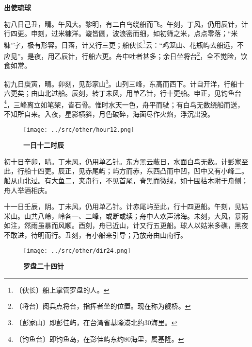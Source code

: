 \documentclass[12pt,UTF-8,openany]{ctexbook}
\begin{document}
\begin{normalsize}
    
    
    \begin{center}
        \textbf{出使琉球}
    \end{center}
    
    初八日己丑，晴。午风大。黎明，有二白鸟绕船而飞。午刻，丁风，仍用辰针，计行四更。申刻，过米糠洋。漩皆圆，波浪密而细，如初筛之米，点点零落；“米糠”字，极有形容。日落，计又行三更；船伙长\footnote{〔伙长〕船上掌管罗盘的人。}云：“鸡笼山、花瓶屿去船远，不应见”。是夜，用乙辰针，行船六更。舟中吐者甚多；余日坐将台\footnote{〔将台〕阅兵点将台，指挥者坐的位置。现在称为舰桥。}，全不觉险，饮食如常。
    
    初九日庚寅，晴。卯刻，见彭家山\footnote{〔彭家山〕即彭佳屿，在台湾省基隆港北约30海里。}。山列三峰，东高而西下。计自开洋，行船十六更矣；由山北过船。辰刻，转丁未风，用单乙针，行十更船。申正，见钓鱼台\footnote{〔钓鱼台〕即钓鱼岛，在彭佳屿东约80海里，属基隆。}，三峰离立如笔架，皆石骨。惟时水天一色，舟平而驶；有白鸟无数绕船而送，不知所自来。入夜，星影横斜，月色破碎，海面尽作火焰，浮沉出没。
    

    \begin{wrapfigure}{r}{0.42\textwidth} %
        \vspace{-20pt}
        \begin{flushright}
            \texttt{[image: ../src/other/hour12.png]}
        \end{flushright}
        \caption*{\textbf{一日十二时辰}}
    \end{wrapfigure}

    初十日辛卯，晴。丁未风，仍用单乙针。东方黑云蔽日，水面白鸟无数。计彭家至此，行船十四更。辰正，见赤尾屿；屿方而赤，东西凸而中凹，凹中又有小峰二。船从山北过。有大鱼二，夹舟行，不见首尾，脊黑而微绿，如十围枯木附于舟侧；舟人举酒相庆。
    
    十一日壬辰，阴。丁未风，仍用单乙针。计赤尾屿至此，行十四更船。午刻，见姑米山。山共八岭，岭各一、二峰，或断或续；舟中人欢声沸海。未刻，大风，暴雨如注，然雨虽暴而风顺。酉刻，舟已近山，计又行五更船。球人以姑米多礁，黑夜不敢进，待明而行。丑刻，有小船来引导；乃放舟由山南行。

    \begin{wrapfigure}{l}{0.42\textwidth} %
        \vspace{-10pt}
        \begin{flushleft}
            \texttt{[image: ../src/other/dir24.png]}
        \end{flushleft}
        \caption*{\textbf{罗盘二十四针}}
    \end{wrapfigure}
    

\end{normalsize}
\end{document}
